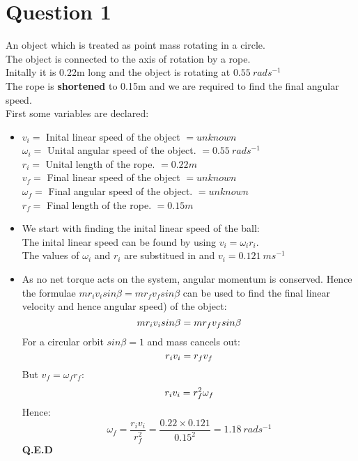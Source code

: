 \documentclass[10pt]{article}
\begin{document}
\section{Question 1}
An object which is treated as point mass rotating in a circle. \\
The object is connected to the axis of rotation by a rope. \\
Initally it is 0.22m long and the object is rotating at $0.55 \ rads^{-1}$ \\
The rope is \textbf{shortened} to 0.15m and we are required to find the final angular speed.\\

First some variables are declared: \\ 
\begin{itemize}
\item $v_i =$ Inital linear speed of the object $=unknown$ \\
$\omega_i =$  Unital angular speed of the object. $= 0.55 \ rads^{-1} $ \\
$r_i =$ Unital length of the rope. $= 0.22m $ \\
$v_f =$ Final linear speed of the object $= unknown$ \\
$\omega_f =$  Final angular speed of the object. $ = unknown$\\
$r_f =$ Final length of the rope. $ = 0.15m$

\item We start with finding the inital linear speed of the ball: \\
The inital linear speed can be found by using $v_i=\omega_ir_i$. \\
The values of $\omega_i$ and $r_i$ are substitued in and $v_i = 0.121 \ ms^{-1}$
\item As no net torque acts on the system, angular momentum is conserved. Hence the formulae $mr_iv_isin\beta=mr_fv_fsin\beta$ can be used to find the final linear velocity and hence angular speed) of the object: \\
\begin{displaymath}
mr_iv_isin\beta=mr_fv_fsin\beta \\
\end{displaymath}
For a circular orbit $sin\beta=1$ and mass cancels out: \\
\begin{displaymath}
r_iv_i=r_fv_f \\
\end{displaymath}
But $v_f=\omega_fr_f$: \\
\begin{displaymath}
r_iv_i=r_f^2\omega_f \\
\end{displaymath}
Hence:
\begin{displaymath}
\omega_f = \frac{r_iv_i}{r_f^2}=\frac{0.22\times0.121}{0.15^2}=1.18 \ rads^{-1}
\end{displaymath}
\textbf{Q.E.D}
\end{itemize}
\pagebreak
\end{document}
